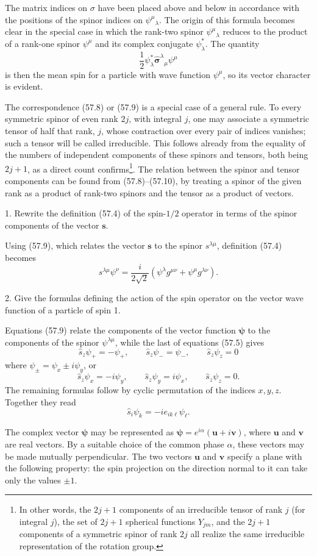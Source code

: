 The matrix indices on $\sigma$ have been placed above and below in accordance
with the positions of the spinor indices on $\psi^\mu{}_{\lambda}$. The origin
of this formula becomes clear in the special case in which the rank-two
spinor $\psi^\mu{}_{\lambda}$ reduces to the product of a rank-one spinor
$\psi^\mu$ and its complex conjugate $\psi_\lambda^*$. The quantity
\[
 \frac12\psi_\lambda^*\hat{\boldsymbol\sigma}^\lambda{}_{\mu}\psi^\mu
\]
is then the mean spin for a particle with wave function $\psi^\mu$, so its
vector character is evident.

The correspondence (57.8) or (57.9) is a special case of a general rule. To
every symmetric spinor of even rank $2j$, with integral $j$, one may associate
a symmetric tensor of half that rank, $j$, whose contraction over every pair
of indices vanishes; such a tensor will be called irreducible. This follows
already from the equality of the numbers of independent components of these
spinors and tensors, both being $2j+1$, as a direct count confirms\footnote{In
other words, the $2j+1$ components of an irreducible tensor of rank $j$ (for
integral $j$), the set of $2j+1$ spherical functions $Y_{jm}$, and the
$2j+1$ components of a symmetric spinor of rank $2j$ all realize the same
irreducible representation of the rotation group.}. The relation between the
spinor and tensor components can be found from (57.8)--(57.10), by treating a
spinor of the given rank as a product of rank-two spinors and the tensor as a
product of vectors.

\ProblemHeading

1. Rewrite the definition (57.4) of the spin-$1/2$ operator in terms of the
spinor components of the vector $\mathbf s$.

\SolutionHeading

Using (57.9), which relates the vector $\mathbf s$ to the spinor
$s^{\lambda\mu}$, definition (57.4) becomes
\[
 s^{\lambda\mu}\psi^\nu=\frac i{2\sqrt2}
 (\psi^\lambda g^{\mu\nu}+\psi^\mu g^{\lambda\nu}).
\]

2. Give the formulas defining the action of the spin operator on the vector
wave function of a particle of spin 1.

\SolutionHeading

Equations (57.9) relate the components of the vector function
$\boldsymbol\psi$ to the components of the spinor $\psi^{\lambda\mu}$, while
the last of equations (57.5) gives
\[
 \hat s_z\psi_+=-\psi_+,
 \qquad \hat s_z\psi_-=\psi_-,
 \qquad \hat s_z\psi_z=0
\]
where $\psi_\pm=\psi_x\pm i\psi_y$, or
\[
 \hat s_z\psi_x=-i\psi_y,\qquad
 \hat s_z\psi_y=i\psi_x,\qquad
 \hat s_z\psi_z=0.
\]
The remaining formulas follow by cyclic permutation of the indices $x,y,z$.
Together they read
\[
 \hat s_i\psi_k=-ie_{ik\ell}\psi_\ell.
\]

The complex vector $\boldsymbol\psi$ may be represented as
$\boldsymbol\psi=e^{i\alpha}(\mathbf u+i\mathbf v)$, where $\mathbf u$ and
$\mathbf v$ are real vectors. By a suitable choice of the common phase
$\alpha$, these vectors may be made mutually perpendicular. The two vectors
$\mathbf u$ and $\mathbf v$ specify a plane with the following property: the
spin projection on the direction normal to it can take only the values
$\pm1$.
